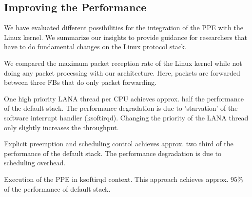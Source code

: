 \documentclass{sig-alternate}
\begin{document}
\subsection{Improving the Performance}
We have evaluated different possibilities for the integration of the PPE with the 
Linux kernel. We summarize our insights to provide guidance for researchers that have to do fundamental changes on the Linux protocol stack.

We compared the maximum packet reception rate of the Linux kernel while not doing any packet processing with our architecture. Here, packets are forwarded between three FBs that do only packet forwarding. 


\begin{compactitem}
\item One high priority LANA thread per CPU achieves approx. half the performance of the default stack. The performance degradation is due to 'starvation' of the software interrupt handler (ksoftirqd). Changing the priority of the LANA thread only slightly increases the throughput.
\item Explicit preemption and scheduling control achieves approx. two third of the performance of the default stack. The performance degradation is due to scheduling overhead. 
\item Execution of the PPE in ksoftirqd context. This approach achieves
      approx. $95\%$ of the performance of default stack.
\end{compactitem}
\end{document}
